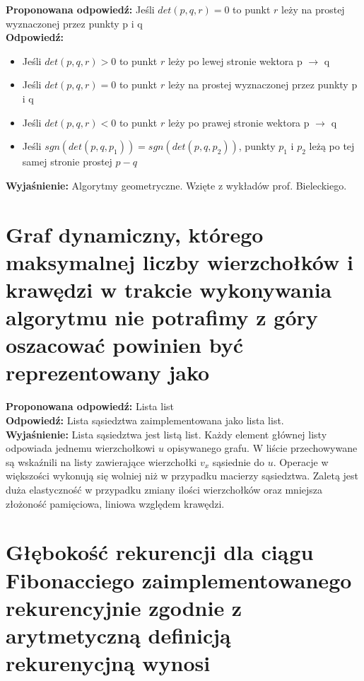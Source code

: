 \vspace{0.4cm}
\noindent \textbf{Proponowana odpowiedź:} Jeśli $det(p, q, r) = 0$ to punkt $r$ leży na prostej wyznaczonej przez punkty p i q \\ 

\noindent \textbf{Odpowiedź:}
\begin{itemize}
	\item Jeśli $det(p, q, r) > 0$ to punkt $r$ leży po lewej stronie wektora p $\rightarrow$ q
	\item Jeśli $det(p, q, r) = 0$ to punkt $r$ leży na prostej wyznaczonej przez punkty p i q
	\item Jeśli $det(p, q, r) < 0$ to punkt $r$ leży po prawej stronie wektora p $\rightarrow$ q
	\item Jeśli $sgn(det(p, q, p_1)) = sgn(det(p,q, p_2))$, punkty $p_1$ i $p_2$ leżą po tej samej stronie prostej $p - q$
\end{itemize}

\noindent \textbf{Wyjaśnienie:}
Algorytmy geometryczne. Wzięte z wykładów prof. Bieleckiego.

\section{Graf dynamiczny, którego maksymalnej liczby wierzchołków i krawędzi w trakcie wykonywania algorytmu nie potrafimy z góry oszacować powinien być reprezentowany jako}


\vspace{0.4cm}
\noindent \textbf{Proponowana odpowiedź:} Lista list \\ 

\noindent \textbf{Odpowiedź:} Lista sąsiedztwa zaimplementowana jako lista list. \\

\noindent \textbf{Wyjaśnienie:}
Lista sąsiedztwa jest listą list. Każdy element głównej listy odpowiada jednemu wierzchołkowi $u$ opisywanego grafu. W liście przechowywane są wskaźnili na listy zawierające wierzchołki $v_x$ sąsiednie do $u$. Operacje w większości wykonują się wolniej niż w przypadku macierzy sąsiedztwa. Zaletą jest duża elastyczność w przypadku zmiany ilości wierzchołków oraz mniejsza złożoność pamięciowa, liniowa względem krawędzi.



\section{Głębokość rekurencji dla ciągu Fibonacciego zaimplementowanego rekurencyjnie zgodnie z arytmetyczną definicją rekurenycjną wynosi}

